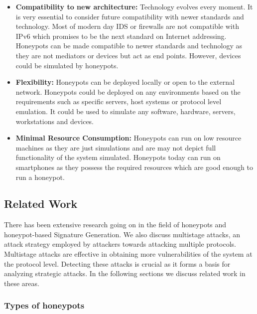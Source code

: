 \documentclass[article,msc=informatik,type=msc,colorback,accentcolor=tud9c]{tudthesis}
\begin{document}
\begin{itemize}
	\item\textbf{Compatibility to new architecture:} Technology evolves every moment. It is very essential to consider future compatibility with newer standards and technology. Most of modern day IDS or firewalls are not compatible with \ac{IPv6} which promises to be the next standard on Internet addressing. Honeypots can be made compatible to newer standards and technology as they are not mediators or devices but act as end points. However, devices could be simulated by honeypots. 

	\item\textbf{Flexibility:} Honeypots can be deployed locally or open to the external network. Honeypots could be deployed on any environments based on the requirements such as specific servers, host systems or protocol level emulation. It could be used to simulate any software, hardware, servers, workstations and devices. 

	\item\textbf{Minimal Resource Consumption:} Honeypots can run on low resource machines as they are just simulations and are may not depict full functionality of the system simulated. Honeypots today can run on smartphones as they possess the required resources which are good enough to run a honeypot.

	\end{itemize}
	
	
	\subsection{Related Work} \label{Related Work}
	There has been extensive research going on in the field of honeypots and honeypot-based Signature Generation. 
	We also discuss multistage attacks, an attack strategy employed by attackers towards attacking multiple protocols. Multistage attacks are effective in obtaining more vulnerabilities of the system at the protocol level. Detecting these attacks is crucial as it forms a basis for analyzing strategic attacks.  In the following sections we discuss related work in these areas.
	
	\vspace{3mm} 
	 \subsubsection {Types of honeypots }\label{Types of honeypots}
\end{document}
